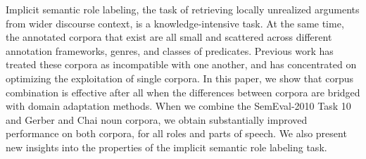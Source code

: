 Implicit semantic role labeling, the task of retrieving locally unrealized arguments from wider discourse context, is a knowledge-intensive task. At the same time, the annotated corpora that exist are all small and scattered across different annotation frameworks, genres, and classes of predicates. Previous work has treated these corpora as incompatible with one another, and has concentrated on optimizing the exploitation of single corpora. In this paper, we show that corpus combination is effective after all when the differences between corpora are bridged with domain adaptation methods. When we combine the SemEval-2010 Task 10 and Gerber and Chai noun corpora, we obtain substantially improved performance on both corpora, for all roles and parts of speech. We also present new insights into the properties of the implicit semantic role labeling task.
